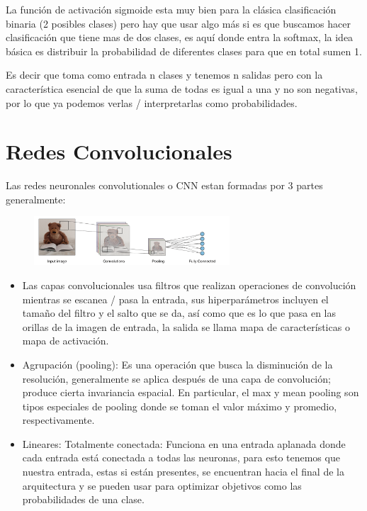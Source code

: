 \documentclass[12pt, fleqn]{report}                             %
\newcommand \Quote              {\qq}                           %
\theoremstyle{break}                                            %
\begin{document}
        La función de activación sigmoide esta muy bien para la clásica clasificación binaria (2 posibles clases)
        pero hay que usar algo más si es que buscamos hacer clasificación que tiene mas de dos clases, es aquí donde entra
        la softmax, la idea básica es distribuir la probabilidad de diferentes clases para que en total sumen 1.

        Es decir que toma como entrada n clases y tenemos n salidas pero con la característica esencial de que la suma
        de todas es igual a una y no son negativas, por lo que ya podemos verlas / interpretarlas como probabilidades.

        \section{Redes Convolucionales}

        Las redes neuronales convolutionales o CNN estan formadas por 3 partes generalmente:
        \begin{figure}[ht!]
            \centering
            \includegraphics[width=0.65\textwidth]{bear}
        \end{figure}

        \begin{itemize}
            \item 
                Las capas convolucionales usa filtros que realizan operaciones de convolución mientras se
                escanea / pasa la \Quote{imagen} entrada, sus hiperparámetros incluyen el tamaño del filtro y el salto que se da,
                así como que es lo que pasa en las orillas de la imagen de entrada, la salida se llama mapa de características
                o mapa de activación.
            \item 
                Agrupación (pooling): Es una operación que busca la disminución de la resolución, 
                generalmente se aplica después de una capa de convolución; produce cierta invariancia espacial. 
                En particular, el max y mean pooling son tipos especiales de pooling donde 
                se toman el valor máximo y promedio, respectivamente.
            \item Lineares:
                Totalmente conectada: Funciona en una entrada aplanada donde cada entrada está conectada a todas
                las neuronas, para esto tenemos que \Quote{espagetificar} nuestra entrada, estas si están presentes,
                se encuentran hacia el final de la arquitectura y se pueden usar para optimizar objetivos
                como las probabilidades de una clase.
        \end{itemize}
        
\end{document}
